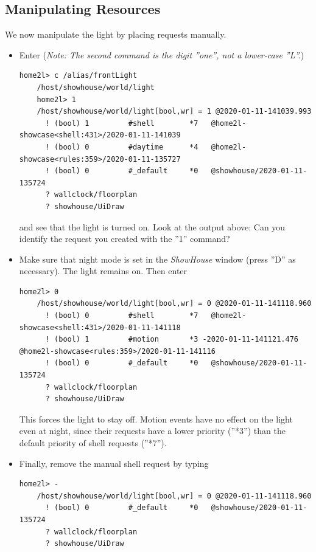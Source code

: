 \documentclass[12pt,english,parskip=half,headheight=19pt]{scrreprt}
\begin{document}
\subsection{Manipulating Resources}
\label{sec:tutorial-shell-manipulate}


We now manipulate the light by placing requests manually.

\begin{itemize}[$\blacktriangleright$]

\item
  Enter (\textit{Note: The second command is the digit ''one'', not a
  lower-case ''L''.})
  \begin{lstlisting}[language=home2l]
    home2l> c /alias/frontLight
    /host/showhouse/world/light
    home2l> 1
    /host/showhouse/world/light[bool,wr] = 1 @2020-01-11-141039.993
      ! (bool) 1         #shell        *7   @home2l-showcase<shell:431>/2020-01-11-141039
      ! (bool) 0         #daytime      *4   @home2l-showcase<rules:359>/2020-01-11-135727
      ! (bool) 0         #_default     *0   @showhouse/2020-01-11-135724
      ? wallclock/floorplan
      ? showhouse/UiDraw
  \end{lstlisting}
  and see that the light is turned on. Look at the output above: Can you
  identify the request you created with the ''1'' command?

\item
  Make sure that night mode is set in the \textit{ShowHouse} window (press ''D'' as necessary). The
  light remains on. Then enter
  \begin{lstlisting}[language=home2l]
    home2l> 0
    /host/showhouse/world/light[bool,wr] = 0 @2020-01-11-141118.960
      ! (bool) 0         #shell        *7   @home2l-showcase<shell:431>/2020-01-11-141118
      ! (bool) 1         #motion       *3 -2020-01-11-141121.476   @home2l-showcase<rules:359>/2020-01-11-141116
      ! (bool) 0         #_default     *0   @showhouse/2020-01-11-135724
      ? wallclock/floorplan
      ? showhouse/UiDraw
  \end{lstlisting}
  This forces the light to stay off. Motion events have no effect on the
  light even at night, since their requests have a lower priority
  (''*3'') than the default priority of shell requests (''*7'').

\item
  Finally, remove the manual shell request by typing
  \begin{lstlisting}[language=home2l]
    home2l> -
    /host/showhouse/world/light[bool,wr] = 0 @2020-01-11-141118.960
      ! (bool) 0         #_default     *0   @showhouse/2020-01-11-135724
      ? wallclock/floorplan
      ? showhouse/UiDraw
  \end{lstlisting}

\end{itemize}
\end{document}
